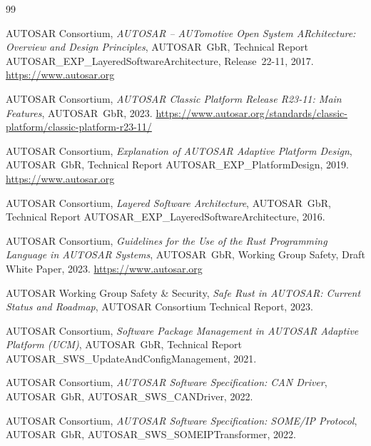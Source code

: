 ﻿\documentclass[12pt,a4paper,twoside]{article}
\begin{document}
\begin{thebibliography}{99}


  {AUTOSAR Consortium},
  \textit{AUTOSAR -- AUTomotive Open System ARchitecture: Overview and Design Principles},
  AUTOSAR~GbR, Technical Report AUTOSAR\_EXP\_LayeredSoftwareArchitecture,
  Release~22-11, 2017.
  \url{https://www.autosar.org}

  {AUTOSAR Consortium},
  \textit{AUTOSAR Classic Platform Release R23-11: Main Features},
  AUTOSAR~GbR, 2023.
  \url{https://www.autosar.org/standards/classic-platform/classic-platform-r23-11/}

  {AUTOSAR Consortium},
  \textit{Explanation of AUTOSAR Adaptive Platform Design},
  AUTOSAR~GbR, Technical Report AUTOSAR\_EXP\_PlatformDesign, 2019.
  \url{https://www.autosar.org}

  {AUTOSAR Consortium},
  \textit{Layered Software Architecture},
  AUTOSAR~GbR, Technical Report AUTOSAR\_EXP\_LayeredSoftwareArchitecture, 2016.

  {AUTOSAR Consortium},
  \textit{Guidelines for the Use of the Rust Programming Language in AUTOSAR Systems},
  AUTOSAR~GbR, Working Group Safety, Draft White Paper, 2023.
  \url{https://www.autosar.org}

  {AUTOSAR Working Group Safety \& Security},
  \textit{Safe Rust in AUTOSAR: Current Status and Roadmap},
  AUTOSAR Consortium Technical Report, 2023.

  {AUTOSAR Consortium},
  \textit{Software Package Management in AUTOSAR Adaptive Platform (UCM)},
  AUTOSAR~GbR, Technical Report AUTOSAR\_SWS\_UpdateAndConfigManagement, 2021.

  {AUTOSAR Consortium},
  \textit{AUTOSAR Software Specification: CAN Driver},
  AUTOSAR~GbR, AUTOSAR\_SWS\_CANDriver, 2022.

  {AUTOSAR Consortium},
  \textit{AUTOSAR Software Specification: SOME/IP Protocol},
  AUTOSAR~GbR, AUTOSAR\_SWS\_SOMEIPTransformer, 2022.



\end{thebibliography}
\end{document}
